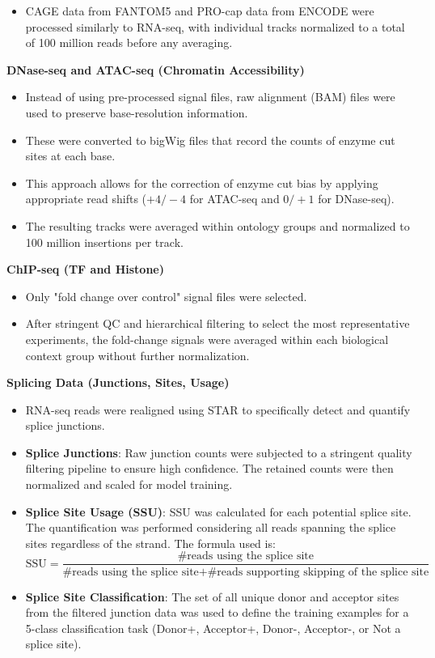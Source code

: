 \documentclass[../main.tex]{subfiles}
\begin{document}
\begin{itemize}
    \item CAGE data from FANTOM5 and PRO-cap data from ENCODE were processed similarly to RNA-seq, with individual tracks normalized to a total of 100 million reads before any averaging.
\end{itemize}

\textbf{DNase-seq and ATAC-seq (Chromatin Accessibility)}

\begin{itemize}
    \item Instead of using pre-processed signal files, raw alignment (BAM) files were used to preserve base-resolution information.
    \item These were converted to bigWig files that record the counts of enzyme cut sites at each base.
    \item This approach allows for the correction of enzyme cut bias by applying appropriate read shifts ($+4/-4$ for ATAC-seq and $0/+1$ for DNase-seq).
    \item The resulting tracks were averaged within ontology groups and normalized to 100 million insertions per track.
\end{itemize}

\textbf{ChIP-seq (TF and Histone)}

\begin{itemize}
    \item Only "fold change over control" signal files were selected.
    \item After stringent QC and hierarchical filtering to select the most representative experiments, the fold-change signals were averaged within each biological context group without further normalization.
\end{itemize}

\textbf{Splicing Data (Junctions, Sites, Usage)}

\begin{itemize}
    \item RNA-seq reads were realigned using STAR to specifically detect and quantify splice junctions.
    \item \textbf{Splice Junctions}: Raw junction counts were subjected to a stringent quality filtering pipeline to ensure high confidence. The retained counts were then normalized and scaled for model training.
    \item \textbf{Splice Site Usage (SSU)}: SSU was calculated for each potential splice site. The quantification was performed considering all reads spanning the splice sites regardless of the strand. The formula used is:
    \begin{equation}
        \text{SSU} = \frac{\text{\#reads using the splice site}}{\text{\#reads using the splice site} + \text{\#reads supporting skipping of the splice site}}
    \end{equation}
    \item \textbf{Splice Site Classification}: The set of all unique donor and acceptor sites from the filtered junction data was used to define the training examples for a 5-class classification task (Donor+, Acceptor+, Donor-, Acceptor-, or Not a splice site).
\end{itemize}
\end{document}
